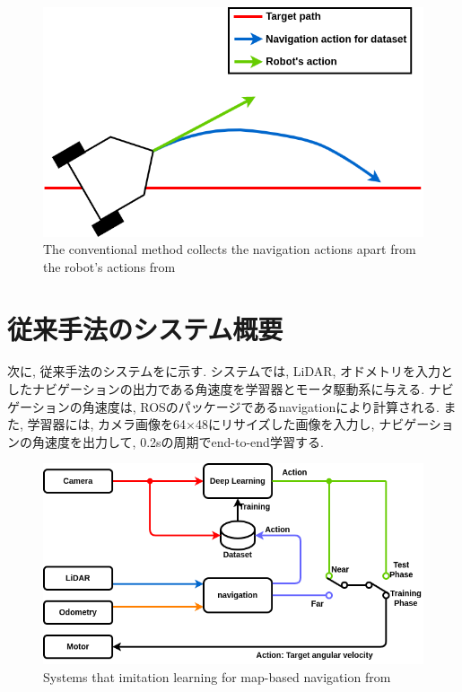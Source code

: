 \begin{figure}[h]
  \centering
  \includegraphics[keepaspectratio, scale=0.4]{images/old-method3.png}
  \caption{The conventional method collects the navigation actions apart from the robot's actions from \cite{okada-si2020}}
  \label{Fig:old-method3}
  \end{figure}

\newpage
\section{従来手法のシステム概要}
次に, 従来手法のシステムをに示す. システムでは, LiDAR, オドメトリを入力としたナビゲーションの出力である角速度を学習器とモータ駆動系に与える. ナビゲーションの角速度は, ROSのパッケージであるnavigation\cite{navigation}により計算される. また, 学習器には, カメラ画像を64×48にリサイズした画像を入力し, ナビゲーションの角速度を出力して, 0.2sの周期でend-to-end学習する. 

\vspace{10mm}
\begin{figure}[h]
  \centering
  \includegraphics[keepaspectratio, scale=0.45]
  {images/okada-method.png}
  \caption{Systems that imitation learning for map-based navigation from \cite{okada-si2021}}
  \label{Fig:okada-method}
  \end{figure}

